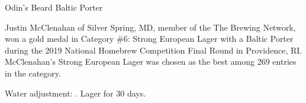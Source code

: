 \begin{recipe}{Odin's Beard Baltic Porter}

\begin{aboutblock}
Justin McClenahan of Silver Spring, MD, member of the The Brewing Network, won a
gold medal in Category \#6: Strong European Lager with a Baltic Porter during the
2019 National Homebrew Competition Final Round in Providence, RI. McClenahan's
Strong European Lager was chosen as the best among 269 entries in the category.
\sourceaha
\end{aboutblock}


\begin{methodandtiming}
 
\begin{mashsteps}
\end{mashsteps}

\begin{fermentationsteps}
\end{fermentationsteps}

\begin{directions}
Water adjustment: . Lager for 30 days.
\end{directions}

\end{methodandtiming}

\recipebreak

\begin{ingredientsblock}

\begin{malts}
\end{malts}

\begin{hops}
\end{hops}

\begin{yeastsx}
\end{yeastsx}

\end{ingredientsblock}

\end{recipe}